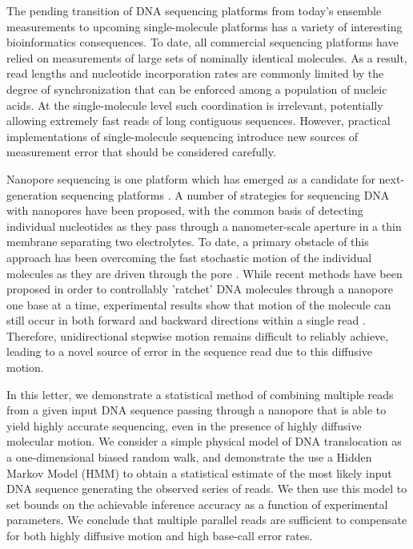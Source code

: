 \documentclass{biophys_letter}
\begin{document}
\begin{multicols}{2}
The pending transition of DNA sequencing platforms from today's ensemble measurements to upcoming single-molecule platforms has a variety of interesting bioinformatics consequences.
To date, all commercial sequencing platforms have relied on measurements of large sets of nominally identical molecules.
As a result, read lengths and nucleotide incorporation rates are commonly limited by the degree of synchronization that can be enforced among a population of nucleic acids.
At the single-molecule level such coordination is irrelevant, potentially allowing extremely fast reads of long contiguous sequences.
However, practical implementations of single-molecule sequencing introduce new sources of measurement error that should be considered carefully.

Nanopore sequencing is one platform which has emerged as a candidate for next-generation sequencing platforms \cite{Branton:2008}.
A number of strategies for sequencing DNA with nanopores have been proposed, with the common basis of detecting individual nucleotides as they pass through a nanometer-scale aperture in a thin membrane separating two electrolytes.
To date, a primary obstacle of this approach has been overcoming the fast stochastic motion of the individual molecules as they are driven through the pore \cite{Venkatesan:2011, Lu:2011}.
While recent methods have been proposed in order to controllably 'ratchet' DNA molecules through a nanopore one base at a time, experimental results show that motion of the molecule can still occur in both forward and backward directions within a single read \cite{Luan:2011, Olasagasti:2010, Cherf:2012}.
Therefore, unidirectional stepwise motion remains difficult to reliably achieve, leading to a novel source of error in the sequence read due to this diffusive motion.

In this letter, we demonstrate a statistical method of combining multiple reads from a given input DNA sequence passing through a nanopore that is able to yield highly accurate sequencing, even in the presence of highly diffusive molecular motion.
We consider a simple physical model of DNA translocation as a one-dimensional biased random walk, and demonstrate the use a Hidden Markov Model (HMM) to obtain a statistical estimate of the most likely input DNA sequence generating the observed series of reads.
We then use this model to set bounds on the achievable inference accuracy as a function of experimental parameters.
We conclude that multiple parallel reads are sufficient to compensate for both highly diffusive motion and high base-call error rates.


\end{multicols}
\end{document}
